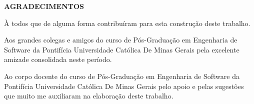 \begin{center}
	\normalsize
	\textbf{AGRADECIMENTOS}
\end{center}

  À todos que de alguma forma contribuíram para esta construção deste trabalho.

  Aos grandes colegas e amigos do curso de Pós-Graduação em Engenharia de Software da Pontifícia Universidade Católica De Minas Gerais pela excelente amizade consolidada neste período.

  Ao corpo docente do curso de Pós-Graduação em Engenharia de Software da Pontifícia Universidade Católica De Minas Gerais pelo apoio e pelas sugestões que muito me auxiliaram na elaboração deste trabalho.

